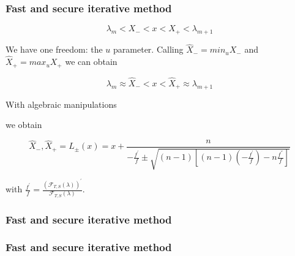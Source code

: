 \documentclass{beamer}
\newcommand{\R}{\mathbb{R}}
\newcommand{\effe}[2]{\mathcal{F}_{#1}(#2)}
\theoremstyle{definition} \newtheorem{de}{Def}
\theoremstyle{remark} \newtheorem{os}[de]{Oss}
\theoremstyle{plain} \newtheorem{te}[de]{Teo}
\theoremstyle{plain} \newtheorem{co}[de]{Cor}
\theoremstyle{plain} \newtheorem{pr}[de]{Prop}
\theoremstyle{plain} \newtheorem{lem}[de]{Lemm}
\theoremstyle{remark} \newtheorem{rem}[de]{Remark}
\begin{document}
\begin{frame}
\frametitle{Fast and secure iterative method}

\begin{equation*}
  \lambda_m < X_{-} < x < X_{+} < \lambda_{m+1}
\end{equation*}

We have one freedom: the $u$ parameter. Calling $\hat X_{-}=min_{u} X_{-}$ and $\hat X_{+}=max_{u} X_{+}$  we can obtain


\begin{equation*}
  \lambda_m \approx \hat X_{-} < x < \hat X_{+} \approx \lambda_{m+1}
\end{equation*}

With algebraic manipulations 


we obtain 

\begin{equation*}
  \hat X_{-}, \hat X_{+} = L_{\pm}(x) = x + \frac{ n }{ -\frac{f^{'}}{f} \pm \sqrt{(n-1)[ (n-1)(-\frac{f^{'}}{f}) -n\frac{f^{''}}{f} ]} }
\end{equation*}

with $\frac{f^{'}}{f}=\frac{ (\effe{T,S}{\lambda})^{'} }{ \effe{T,S}{\lambda} }$.

\end{frame}

\begin{frame}
\frametitle{Fast and secure iterative method}


\end{frame}

\begin{frame}
\frametitle{Fast and secure iterative method}


\end{frame}
\end{document}
